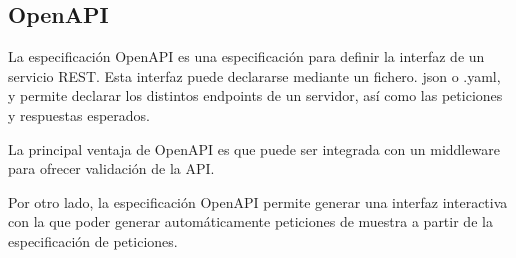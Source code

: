 \hypertarget{openapi}{%
\subsection{OpenAPI}\label{openapi}}

La especificación OpenAPI es una especificación para definir la interfaz
de un servicio REST. Esta interfaz puede declararse mediante un fichero.
json o .yaml, y permite declarar los distintos endpoints de un servidor,
así como las peticiones y respuestas esperados.

La principal ventaja de OpenAPI es que puede ser integrada con un
middleware para ofrecer validación de la API.

Por otro lado, la especificación OpenAPI permite generar una interfaz
interactiva con la que poder generar automáticamente peticiones de
muestra a partir de la especificación de peticiones.

